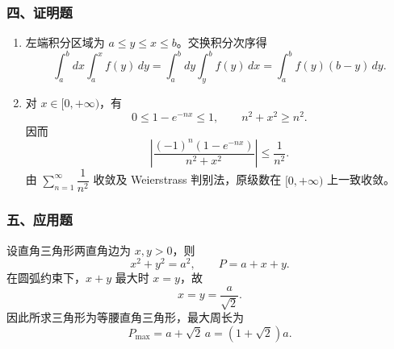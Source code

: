 \subsubsection*{四、证明题}
\begin{enumerate}
  \item 左端积分区域为 $a\le y\le x\le b$。交换积分次序得
  \[
  \int_a^b dx\int_a^x f(y)\,dy
  =\int_a^b dy\int_y^b f(y)\,dx
  =\int_a^b f(y)(b-y)\,dy.
  \]
  \item 对 $x\in[0,+\infty)$，有
  \[
  0\le 1-e^{-nx}\le1,\qquad n^2+x^2\ge n^2.
  \]
  因而
  \[
  \left|\frac{(-1)^n(1-e^{-nx})}{n^2+x^2}\right|\le\frac1{n^2}.
  \]
  由 $\sum_{n=1}^{\infty}\dfrac1{n^2}$ 收敛及 Weierstrass 判别法，原级数在 $[0,+\infty)$ 上一致收敛。
\end{enumerate}

\subsubsection*{五、应用题}
设直角三角形两直角边为 $x,y>0$，则
\[
x^2+y^2=a^2,\qquad P=a+x+y.
\]
在圆弧约束下，$x+y$ 最大时 $x=y$，故
\[
x=y=\frac{a}{\sqrt2}.
\]
因此所求三角形为等腰直角三角形，最大周长为
\[
P_{\max}=a+\sqrt2\,a=(1+\sqrt2)a.
\]

